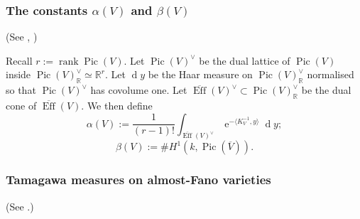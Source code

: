 \documentclass[11pt,letterpaper]{amsart}
\newcommand{\BR}{{\mathbb {R}}}
\newcommand{\Pic}{\operatorname{Pic}}
\theoremstyle{plain}
\numberwithin{equation}{section}
\theoremstyle{definition}
\theoremstyle{remark}
\begin{document}
\subsubsection{The constants $\alpha(V)$ and $\beta(V)$}
 (See \cite[D\'efinition 2.4]{Peyre}, \cite[Définition 4.8]{PeyreLille})
 
Recall $r:=\operatorname{rank}\operatorname{Pic}(V)$. Let $\Pic(V)^\vee$ be the dual lattice of $\Pic(V)$ inside $\Pic(V)^\vee_\BR\simeq \BR^r$. Let $\operatorname{d}y$ be the Haar measure on $\Pic(V)^\vee_\BR$ normalised so that $\Pic(V)^\vee$ has covolume one. Let $\overline{\operatorname{Eff}}(V)^\vee\subset\Pic(V)^\vee_\BR$ be the dual cone of $\overline{\operatorname{Eff}}(V)$.
We then define
\begin{equation}\label{eq:alphaV}
	\alpha(V):=\frac{1}{(r-1)!}\int_{\overline{\operatorname{Eff}}(V)^\vee}\operatorname{e}^{-\langle K_V^{-1},y\rangle}\operatorname{d}y;
\end{equation} 
\begin{equation}\label{eq:beta}
	\beta(V):=\#H^1(k,\operatorname{Pic}(\overline{V})).
\end{equation}

\subsubsection{Tamagawa measures on almost-Fano varieties}
(See \cite[\S2.2.3]{Peyre}.)
\end{document}
